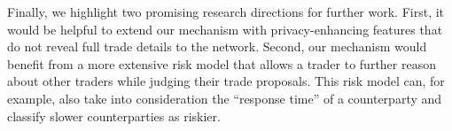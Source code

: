 Finally, we highlight two promising research directions for further work.
First, it would be helpful to extend our mechanism with privacy-enhancing features that do not reveal full trade details to the network.
Second, our mechanism would benefit from a more extensive risk model that allows a trader to further reason about other traders while judging their trade proposals.
This risk model can, for example, also take into consideration the \enquote{response time} of a counterparty and classify slower counterparties as riskier.